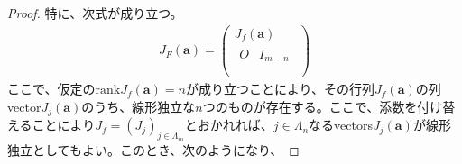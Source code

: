 \documentclass[dvipdfmx]{jsarticle}
\begin{document}
\begin{proof}
\begin{comment}
 \vdots & \vdots & \ddots & \vdots & \vdots & \vdots & \ddots & \vdots \\
\partial_{1}x_{m} & \partial_{2}x_{m} & \cdots & \partial_{n}x_{m} & \partial_{n + 1}x_{m} & \partial_{n + 2}x_{m} & \cdots & \partial_{m}x_{m} \\
\end{pmatrix}\\
&= \begin{pmatrix}
\partial_{1}f_{1} & \partial_{2}f_{1} & \cdots & \partial_{n}f_{1} & \partial_{n + 1}f_{1} & \partial_{n + 2}f_{1} & \cdots & \partial_{m}f_{1} \\
\partial_{1}f_{2} & \partial_{2}f_{2} & \cdots & \partial_{n}f_{2} & \partial_{n + 1}f_{2} & \partial_{n + 2}f_{2} & \cdots & \partial_{m}f_{2} \\
 \vdots & \vdots & \ddots & \vdots & \vdots & \vdots & \ddots & \vdots \\
\partial_{1}f_{n} & \partial_{2}f_{n} & \cdots & \partial_{n}f_{n} & \partial_{n + 1}f_{n} & \partial_{n + 2}f_{n} & \cdots & \partial_{m}f_{n} \\
0 & \  & \  & O & 1 & \  & \  & O \\
\  & 0 & \  & \  & \  & 1 & \  & \  \\
\  & \  & \ddots & \  & \  & \  & \ddots & \  \\
O & \  & \  & 0 & O & \  & \  & 1 \\
\end{pmatrix}\\
&= \begin{pmatrix}
J_{f} \\
\begin{matrix}
O & I_{m - n} \\
\end{matrix} \\
\end{pmatrix}
\end{align*}
\end{comment}
特に、次式が成り立つ。
\begin{align*}
J_{F}\left( \mathbf{a} \right) = \begin{pmatrix}
J_{f}\left( \mathbf{a} \right) \\
\begin{matrix}
O & I_{m - n} \\
\end{matrix} \\
\end{pmatrix}
\end{align*}
ここで、仮定の$\mathrm{rank}J_{f}\left( \mathbf{a} \right) = n$が成り立つことにより、その行列$J_{f}\left( \mathbf{a} \right)$の列vector$J_{j}\left( \mathbf{a} \right)$のうち、線形独立な$n$つのものが存在する。ここで、添数を付け替えることにより$J_{f} = \left( J_{j} \right)_{j \in \varLambda_{m}}$とおかれれば、$j \in \varLambda_{n}$なるvectors$J_{j}\left( \mathbf{a} \right)$が線形独立としてもよい。このとき、次のようになり、

\end{proof}
\end{document}
